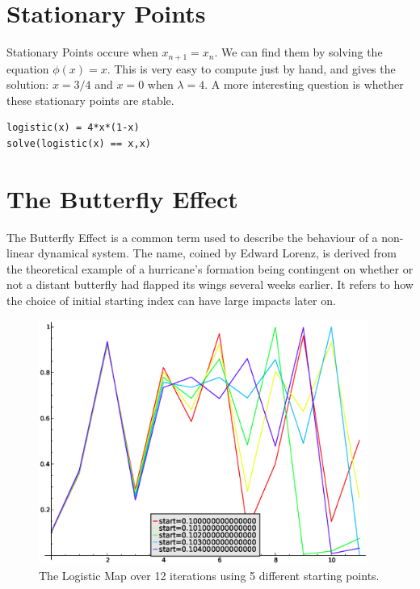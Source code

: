 \documentclass[a4paper]{article}
\begin{document}
\section{Stationary Points}
Stationary Points occure when $x_{n+1}=x_n$. We can find them by solving the equation $\phi(x)=x$. This is very easy to compute just by hand, and gives the solution: $x=3/4$ and $x=0$ when $\lambda =4$. A more interesting question is whether these stationary points are stable.

\begin{verbatim}
logistic(x) = 4*x*(1-x)
solve(logistic(x) == x,x)
\end{verbatim}


\section{The Butterfly Effect}
The Butterfly Effect is a common term used to describe the behaviour of a non-linear dynamical system. The name, coined by Edward Lorenz, is derived from the theoretical example of a hurricane's formation being contingent on whether or not a distant butterfly had flapped its wings several weeks earlier.\cite{wiki:xxx} It refers to how the choice of initial starting index can have large impacts later on.
\begin{figure}[htdp]
\begin{center}
\includegraphics[keepaspectratio=False, width=\linewidth,height=8cm]{images/butterflyeffect}
\end{center}
\caption{The Logistic Map over 12 iterations using 5 different starting points.}
\label{butterflyeffect}
\end{figure}



\end{document}
